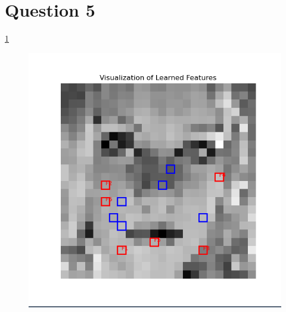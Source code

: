 \documentclass{article}
\begin{document}
\section{Question 5}
\ref{fig:facepreds}
\begin{figure}
    \centering
    \includegraphics[width=1\linewidth]{FacePreds.png}
    \label{fig:facepreds}
\end{figure}
\end{document}
